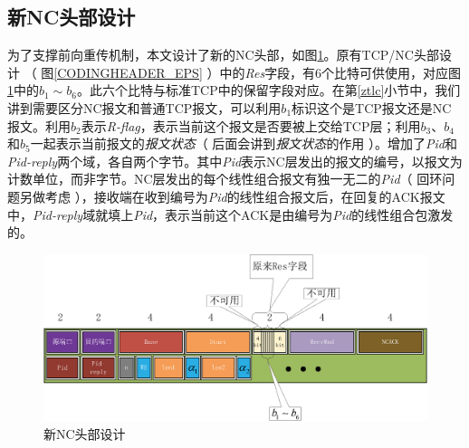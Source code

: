 \subsection{新NC头部设计}\label{sec:newnc}
为了支撑前向重传机制，本文设计了新的NC头部，如图\ref{NEWHEADER_EPS}。原有TCP/NC头部设计 （ 图\ref{CODINGHEADER_EPS} ）中的\emph{Res}字段，有6个比特可供使用，对应图\ref{NEWHEADER_EPS}中的$b_1 \sim b_6$。此六个比特与标准TCP中的保留字段对应。在第\ref{ztlc}小节中，我们讲到需要区分NC报文和普通TCP报文，可以利用$b_1$标识这个是TCP报文还是NC报文。利用$b_2$表示\emph{R-flag}，表示当前这个报文是否要被上交给TCP层；利用$b_3$、$b_4$和$b_5$一起表示当前报文的\emph{报文状态}（ 后面会讲到\emph{报文状态}的作用 ）。增加了\emph{Pid}和\emph{Pid-reply}两个域，各自两个字节。其中\emph{Pid}表示NC层发出的报文的编号，以报文为计数单位，而非字节。NC层发出的每个线性组合报文有独一无二的\emph{Pid}（ 回环问题另做考虑 ），接收端在收到编号为\emph{Pid}的线性组合报文后，在回复的ACK报文中，\emph{Pid-reply}域就填上\emph{Pid}，表示当前这个ACK是由编号为\emph{Pid}的线性组合包激发的。
\begin{figure}[htbp]
	\centering
	\includegraphics[width=6in]{figures/newheader.eps}
	\caption{新NC头部设计}
	\label{NEWHEADER_EPS}
\end{figure}

